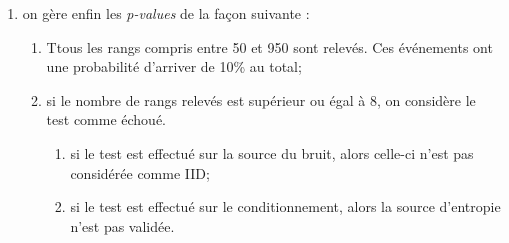 \begin{enumerate}
\item on gère enfin les \textit{p-values} de la façon suivante : 
	\begin{enumerate}
	\item Ttous les rangs compris entre 50 et 950 sont relevés. Ces événements ont une probabilité d'arriver de 10\% au total;
	\item si le nombre de rangs relevés est supérieur ou égal à 8, on considère le test comme échoué.\\
		\begin{enumerate}
		\item si le test est effectué sur la source du bruit, alors celle-ci n'est pas considérée comme IID;
		\item si le test est effectué sur le conditionnement, alors la source d'entropie n'est pas validée.\\
		\end{enumerate}
	\end{enumerate}
\end{enumerate}

